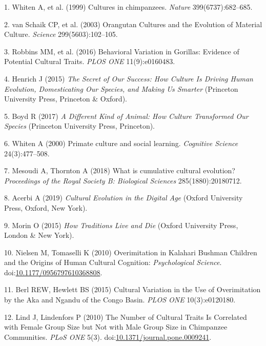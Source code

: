 \documentclass[9pt,twocolumn,twoside,]{pnas-new}
\begin{document}
\showmatmethods
\showacknow
\pnasbreak

\hypertarget{refs}{}
\hypertarget{ref-whiten_cultures_1999}{}
1. Whiten A, et al. (1999) Cultures in chimpanzees. \emph{Nature}
399(6737):682--685.

\hypertarget{ref-van_schaik_orangutan_2003}{}
2. van Schaik CP, et al. (2003) Orangutan Cultures and the Evolution of
Material Culture. \emph{Science} 299(5603):102--105.

\hypertarget{ref-robbins_behavioral_2016}{}
3. Robbins MM, et al. (2016) Behavioral Variation in Gorillas: Evidence
of Potential Cultural Traits. \emph{PLOS ONE} 11(9):e0160483.

\hypertarget{ref-henrich_secret_2015}{}
4. Henrich J (2015) \emph{The Secret of Our Success: How Culture Is
Driving Human Evolution, Domesticating Our Species, and Making Us
Smarter} (Princeton University Press, Princeton \& Oxford).

\hypertarget{ref-boyd_different_2017}{}
5. Boyd R (2017) \emph{A Different Kind of Animal: How Culture
Transformed Our Species} (Princeton University Press, Princeton).

\hypertarget{ref-whiten_primate_2000}{}
6. Whiten A (2000) Primate culture and social learning. \emph{Cognitive
Science} 24(3):477--508.

\hypertarget{ref-mesoudi_what_2018}{}
7. Mesoudi A, Thornton A (2018) What is cumulative cultural evolution?
\emph{Proceedings of the Royal Society B: Biological Sciences}
285(1880):20180712.

\hypertarget{ref-acerbi_cultural_2019}{}
8. Acerbi A (2019) \emph{Cultural Evolution in the Digital Age} (Oxford
University Press, Oxford, New York).

\hypertarget{ref-morin_how_2015}{}
9. Morin O (2015) \emph{How Traditions Live and Die} (Oxford University
Press, London \& New York).

\hypertarget{ref-nielsen_overimitation_2010}{}
10. Nielsen M, Tomaselli K (2010) Overimitation in Kalahari Bushman
Children and the Origins of Human Cultural Cognition:
\emph{Psychological Science}.
doi:\href{https://doi.org/10.1177/0956797610368808}{10.1177/0956797610368808}.

\hypertarget{ref-berl_cultural_2015}{}
11. Berl REW, Hewlett BS (2015) Cultural Variation in the Use of
Overimitation by the Aka and Ngandu of the Congo Basin. \emph{PLOS ONE}
10(3):e0120180.

\hypertarget{ref-lind_number_2010}{}
12. Lind J, Lindenfors P (2010) The Number of Cultural Traits Is
Correlated with Female Group Size but Not with Male Group Size in
Chimpanzee Communities. \emph{PLoS ONE} 5(3).
doi:\href{https://doi.org/10.1371/journal.pone.0009241}{10.1371/journal.pone.0009241}.
\end{document}
